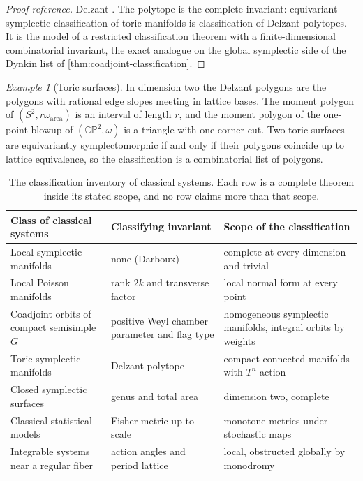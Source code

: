 \documentclass[11pt,letterpaper]{article}
\theoremstyle{definition}
\theoremstyle{remark}
\newtheorem{example}[theorem]{Example}
\begin{document}
\begin{proof}[Proof reference]
Delzant \cite{delzant}. The polytope is the complete invariant: equivariant symplectic classification of toric manifolds is classification of Delzant polytopes. It is the model of a restricted classification theorem with a finite-dimensional combinatorial invariant, the exact analogue on the global symplectic side of the Dynkin list of \cref{thm:coadjoint-classification}.
\end{proof}

\begin{example}[Toric surfaces]
\label{ex:toric-surfaces}
In dimension two the Delzant polygons are the polygons with rational edge slopes meeting in lattice bases. The moment polygon of $(S^{2}, r \omega_{\text{area}})$ is an interval of length $r$, and the moment polygon of the one-point blowup of $(\mathbb{CP}^{2}, \omega)$ is a triangle with one corner cut. Two toric surfaces are equivariantly symplectomorphic if and only if their polygons coincide up to lattice equivalence, so the classification is a combinatorial list of polygons.
\end{example}

\begin{table}[t]
\centering
\small
\begin{tabular}{L{4.2cm}L{4.6cm}L{4.6cm}}
\toprule
Class of classical systems & Classifying invariant & Scope of the classification \\
\midrule
Local symplectic manifolds & none (Darboux) & complete at every dimension and trivial \\
Local Poisson manifolds & rank $2k$ and transverse factor & local normal form at every point \\
Coadjoint orbits of compact semisimple $G$ & positive Weyl chamber parameter and flag type & homogeneous symplectic manifolds, integral orbits by weights \\
Toric symplectic manifolds & Delzant polytope & compact connected manifolds with $T^{n}$-action \\
Closed symplectic surfaces & genus and total area & dimension two, complete \\
Classical statistical models & Fisher metric up to scale & monotone metrics under stochastic maps \\
Integrable systems near a regular fiber & action angles and period lattice & local, obstructed globally by monodromy \\
\bottomrule
\end{tabular}
\caption{The classification inventory of classical systems. Each row is a complete theorem inside its stated scope, and no row claims more than that scope.}
\label{tab:inventory}
\end{table}
\end{document}
